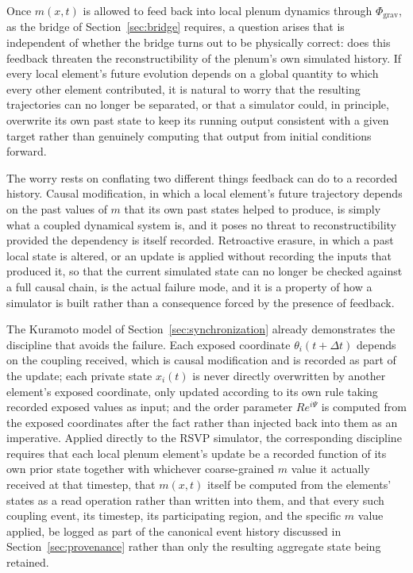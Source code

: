 \documentclass[11pt]{article}
\begin{document}
Once $m(x,t)$ is allowed to feed back into local plenum dynamics through $\Phi_{\mathrm{grav}}$, as the bridge of Section~\ref{sec:bridge} requires, a question arises that is independent of whether the bridge turns out to be physically correct: does this feedback threaten the reconstructibility of the plenum's own simulated history. If every local element's future evolution depends on a global quantity to which every other element contributed, it is natural to worry that the resulting trajectories can no longer be separated, or that a simulator could, in principle, overwrite its own past state to keep its running output consistent with a given target rather than genuinely computing that output from initial conditions forward.

The worry rests on conflating two different things feedback can do to a recorded history. Causal modification, in which a local element's future trajectory depends on the past values of $m$ that its own past states helped to produce, is simply what a coupled dynamical system is, and it poses no threat to reconstructibility provided the dependency is itself recorded. Retroactive erasure, in which a past local state is altered, or an update is applied without recording the inputs that produced it, so that the current simulated state can no longer be checked against a full causal chain, is the actual failure mode, and it is a property of how a simulator is built rather than a consequence forced by the presence of feedback.

The Kuramoto model of Section~\ref{sec:synchronization} already demonstrates the discipline that avoids the failure. Each exposed coordinate $\theta_i(t+\Delta t)$ depends on the coupling received, which is causal modification and is recorded as part of the update; each private state $x_i(t)$ is never directly overwritten by another element's exposed coordinate, only updated according to its own rule taking recorded exposed values as input; and the order parameter $Re^{i\Psi}$ is computed from the exposed coordinates after the fact rather than injected back into them as an imperative. Applied directly to the RSVP simulator, the corresponding discipline requires that each local plenum element's update be a recorded function of its own prior state together with whichever coarse-grained $m$ value it actually received at that timestep, that $m(x,t)$ itself be computed from the elements' states as a read operation rather than written into them, and that every such coupling event, its timestep, its participating region, and the specific $m$ value applied, be logged as part of the canonical event history discussed in Section~\ref{sec:provenance} rather than only the resulting aggregate state being retained.
\end{document}
